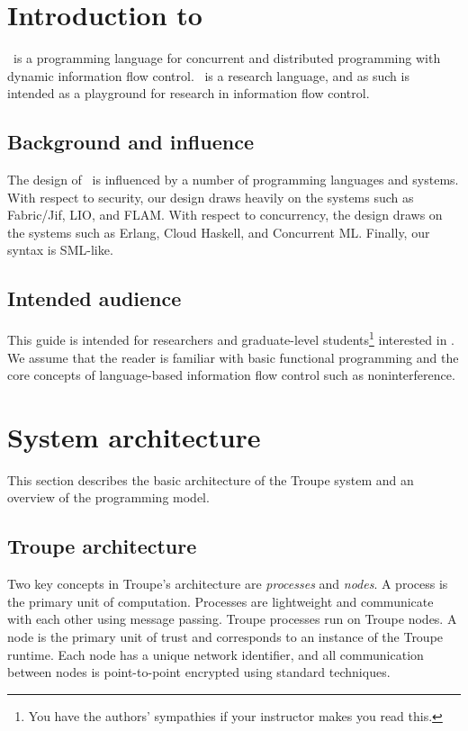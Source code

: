 \section{Introduction to \troupelang}
\troupelang\ is a programming language for concurrent and distributed programming with 
dynamic information flow control. 
\troupelang\ is a research language, and as such is intended as a playground for research in 
information flow control.


\subsection{Background and influence}
The design of \troupelang\ is influenced by a number of programming languages and systems. With respect to 
security, our design draws heavily on the systems such as Fabric/Jif, LIO, and FLAM.
With respect to concurrency, the design draws on the systems such as Erlang, Cloud Haskell, and Concurrent ML.
Finally, our syntax is SML-like.





\subsection{Intended audience}
This guide is intended for researchers and graduate-level students\footnote{You have the authors' sympathies if your instructor makes you read this.} interested in \troupelang.
We assume that the reader is familiar with basic functional programming and the 
core concepts of language-based information flow control such as noninterference.


\section{System architecture}
\label{sec:design}
This section describes the basic architecture of the Troupe system
and an overview of the programming model.

\subsection{Troupe architecture}

Two key concepts in Troupe's architecture are \emph{processes} and \emph{nodes}. A process is the primary unit of computation. Processes are lightweight and communicate with each other using message passing. Troupe processes run on Troupe nodes. A node is the primary unit of trust and corresponds to an instance of the Troupe runtime. Each node has a unique network identifier, and all communication between nodes is point-to-point encrypted using standard techniques.


